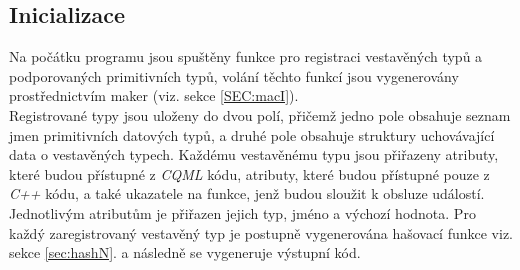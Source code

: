 \documentclass[11pt,twoside,a4paper]{book}
\begin{document}
{{\begin{ttemize}
{{\begin{lastlisting}[frame=single,caption=Řešení v pseudokódu problematického použití operátoru "." v přiřazovacím výroku,label=lst:var0N]
\subsection{Inicializace}
Na počátku programu jsou spuštěny funkce pro registraci vestavěných typů a podporovaných primitivních typů, volání těchto funkcí jsou vygenerovány prostřednictvím maker (viz. sekce \ref{SEC:macI}).\\
Registrované typy jsou uloženy do dvou polí, přičemž jedno pole obsahuje seznam jmen primitivních datových typů, a druhé pole obsahuje struktury uchovávající data o vestavěných typech. Každému vestavěnému typu jsou přiřazeny atributy, které budou přístupné z \textit{CQML} kódu, atributy, které budou přístupné pouze z \textit{C++} kódu, a také ukazatele na funkce, jenž budou sloužit k obsluze událostí. Jednotlivým atributům je přiřazen jejich typ, jméno a výchozí hodnota. Pro každý zaregistrovaný vestavěný typ je postupně vygenerována hašovací funkce viz. sekce \ref{sec:hashN}. a následně se vygeneruje výstupní kód.\\


\end{lastlisting}}}
\end{ttemize}}}
\end{document}
